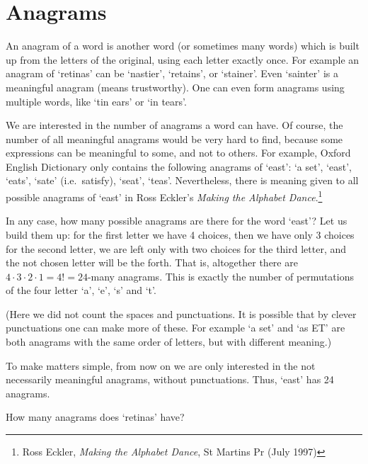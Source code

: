 \section{Anagrams}\label{sec:anagrams}

An anagram of a word is another word (or sometimes many words) which is built up from the letters of the original, 
using each letter exactly once. 
For example an anagram of `retinas' can be `nastier', 
`retains', or `stainer'.
Even `sainter' is a meaningful anagram (means trustworthy). 
One can even form anagrams using multiple words, 
like `tin ears' or `in tears'. 

We are interested in the number of anagrams a word can have. 
Of course, 
the number of all meaningful anagrams would be very hard to find, 
because some expressions can be meaningful to some, 
and not to others. 
For example, Oxford English Dictionary only contains the following anagrams of `east': 
`a set', `east', `eats', `sate' (i.e.\ satisfy), `seat', `teas'. 
Nevertheless, 
there is meaning given to all possible anagrams of `east' in Ross Eckler's \emph{Making the Alphabet Dance}.\footnote{Ross Eckler, \emph{Making the Alphabet Dance}, St Martins Pr (July 1997)}

In any case, how many possible anagrams are there for the word `east'? 
Let us build them up: 
for the first letter we have 4 choices, 
then we have only 3 choices for the second letter, 
we are left only with two choices for the third letter, 
and the not chosen letter will be the forth. 
That is, 
altogether there are $4 \cdot 3 \cdot 2 \cdot 1 = 4! = 24$-many anagrams. 
This is exactly the number of permutations of the four letter `a', `e', `s' and `t'. 

(Here we did not count the spaces and punctuations. 
It is possible that by clever punctuations one can make more of these. 
For example `a set' and `as ET' are both anagrams with the same order of letters, 
but with different meaning.)

To make matters simple, 
from now on we are only interested in the not necessarily meaningful anagrams, 
without punctuations. 
Thus, `east' has 24 anagrams. 

\begin{exercise}\label{ex:retinas}
How many anagrams does `retinas' have? 
\end{exercise}

